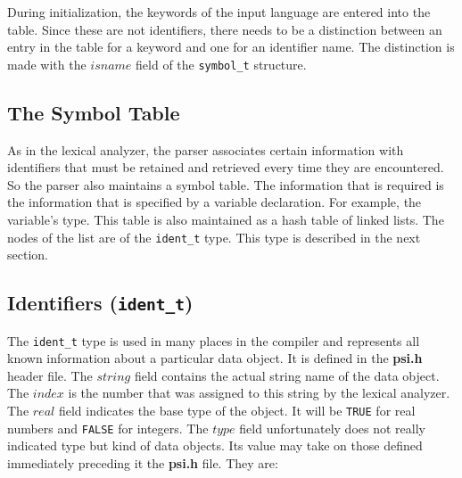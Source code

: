 During initialization, the keywords of the input language are entered into
the table.  Since these are not identifiers, there needs to be a distinction
between an entry in the table for a keyword and one for an identifier name.
The distinction is made with the $isname$ field of the {\tt symbol\_t}
structure.

\subsection{The Symbol Table}
As in the lexical analyzer, the parser associates certain information with
identifiers that must be retained and retrieved every time they are 
encountered.  So the parser also maintains a symbol table.  The information
that is required is the information that is specified by a variable 
declaration.  For example, the variable's type.  This table is also maintained
as a hash table of linked lists.  The nodes of the list are of the
{\tt ident\_t} type.  This type is described in the next section.

\subsection{Identifiers ({\tt ident\_t})}
The {\tt ident\_t} type is used in many places in the compiler and represents
all known information about a particular data object.  It is defined in the
{\bf psi.h} header file. The $string$ field
contains the actual string name of the data object.  The $index$ is the
number that was assigned to this string by the lexical analyzer.  The $real$
field indicates the base type of the object.  It will be {\tt TRUE} for real
numbers
and {\tt FALSE} for integers.  The $type$ field unfortunately does not really 
indicated type but kind of data objects.  Its value may take on those
defined immediately preceding it the {\bf psi.h} file.  They are:

